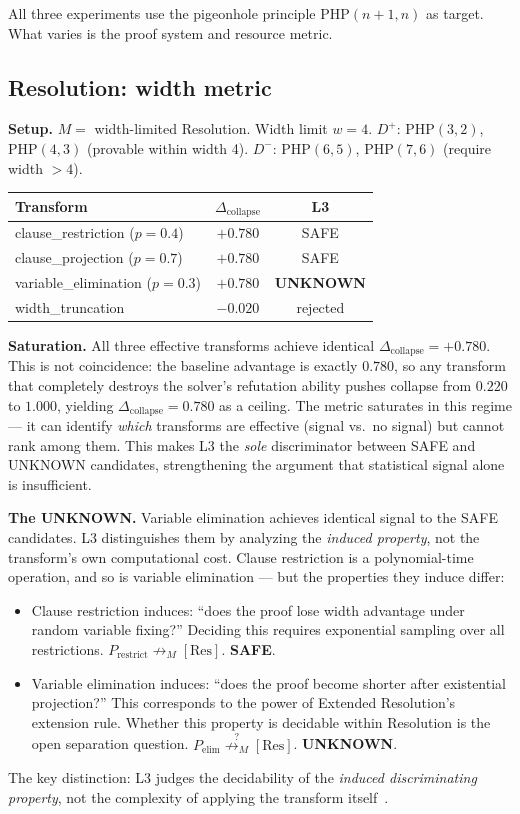 \documentclass[11pt,a4paper]{article}
\newcommand{\unreachM}{\not\rightarrow_M}     %
\newcommand{\Dcollapse}{\Delta_{\mathrm{collapse}}}
\newcommand{\PHP}{\mathrm{PHP}}
\begin{document}
All three experiments use the pigeonhole principle $\PHP(n+1, n)$ as target. What varies is the proof system and resource metric.

\subsection{Resolution: width metric}

\textbf{Setup.} $M = $ width-limited Resolution. Width limit $w = 4$. $D^+$: $\PHP(3,2)$, $\PHP(4,3)$ (provable within width 4). $D^-$: $\PHP(6,5)$, $\PHP(7,6)$ (require width $> 4$).

\begin{center}
\begin{tabular}{@{}lcc@{}}
\toprule
Transform & $\Dcollapse$ & L3 \\
\midrule
clause\_restriction ($p=0.4$) & $+0.780$ & SAFE \\
clause\_projection ($p=0.7$) & $+0.780$ & SAFE \\
variable\_elimination ($p=0.3$) & $+0.780$ & \textbf{UNKNOWN} \\
width\_truncation & $-0.020$ & rejected \\
\bottomrule
\end{tabular}
\end{center}

\textbf{Saturation.} All three effective transforms achieve identical $\Dcollapse = +0.780$. This is not coincidence: the baseline advantage is exactly $0.780$, so any transform that completely destroys the solver's refutation ability pushes collapse from $0.220$ to $1.000$, yielding $\Dcollapse = 0.780$ as a ceiling. The metric saturates in this regime --- it can identify \emph{which} transforms are effective (signal vs.\ no signal) but cannot rank among them. This makes L3 the \emph{sole} discriminator between SAFE and UNKNOWN candidates, strengthening the argument that statistical signal alone is insufficient.

\textbf{The UNKNOWN.} Variable elimination achieves identical signal to the SAFE candidates. L3 distinguishes them by analyzing the \emph{induced property}, not the transform's own computational cost. Clause restriction is a polynomial-time operation, and so is variable elimination --- but the properties they induce differ:
\begin{itemize}[nosep]
    \item Clause restriction induces: ``does the proof lose width advantage under random variable fixing?'' Deciding this requires exponential sampling over all restrictions. $P_{\mathrm{restrict}} \unreachM[\mathrm{Res}]$. \textbf{SAFE}.
    \item Variable elimination induces: ``does the proof become shorter after existential projection?'' This corresponds to the power of Extended Resolution's extension rule. Whether this property is decidable within Resolution is the open separation question. $P_{\mathrm{elim}} \stackrel{?}{\unreachM}[\mathrm{Res}]$. \textbf{UNKNOWN}.
\end{itemize}
The key distinction: L3 judges the decidability of the \emph{induced discriminating property}, not the complexity of applying the transform itself~\cite{CookReckhow1979}.
\end{document}
